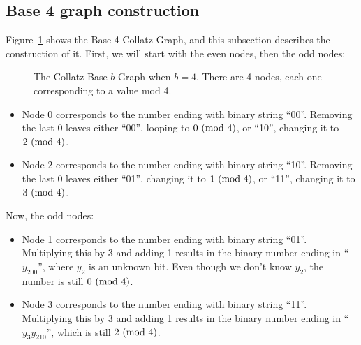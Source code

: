  \subsection{Base 4 graph construction} \label{subsubsec:proofbase4graph}
Figure~\ref{fig:base_4_graph} shows the Base 4 Collatz Graph, and this subsection describes the construction of it. First, we will start with the even nodes, then the odd nodes:
\begin{figure}
    \centering
    \caption{The Collatz Base $b$ Graph when $b = 4$. There are 4 nodes, each one corresponding to a value mod 4.}
    \label{fig:base_4_graph}
\end{figure}

\begin{itemize}
    \item Node 0 corresponds to the number ending with binary string ``00''. Removing the last 0 leaves either ``00'', looping to $0\ (\mathrm{mod}\ 4)$, or ``10'', changing it to $2\ (\mathrm{mod}\ 4)$.
    \item Node 2 corresponds to the number ending with binary string ``10''. Removing the last 0 leaves either ``01'', changing it to $1\ (\mathrm{mod}\ 4)$, or ``11'', changing it to $3\ (\mathrm{mod}\ 4)$.
\end{itemize}
Now, the odd nodes:
\begin{itemize}
    \item Node 1 corresponds to the number ending with binary string ``01''. Multiplying this by 3 and adding 1 results in the binary number ending in ``$y_200$'', where $y_2$ is an unknown bit. Even though we don't know $y_2$, the number is still $0\ (\mathrm{mod}\ 4)$.
    \item Node 3 corresponds to the number ending with binary string ``11''. Multiplying this by 3 and adding 1 results in the binary number ending in ``$y_3y_210$'', which is still $2\ (\mathrm{mod}\ 4)$.
\end{itemize}
